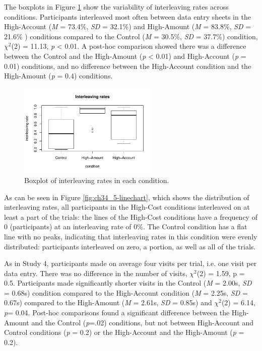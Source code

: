 The boxplots in Figure \ref{fig:ch34_5-boxplots} show the variability of interleaving rates across conditions. Participants interleaved most often between data entry sheets in the High-Account (\textit{M} = 73.4\%, \textit{SD} = 32.1\%) and High-Amount (\textit{M} = 83.8\%, \textit{SD} = 21.6\% ) conditions compared to the Control (\textit{M} = 30.5\%, \textit{SD} = 37.7\%) condition, $\chi^2$(2) = 11.13, \textit{p} < 0.01. A post-hoc comparison showed there was a difference between the Control and the High-Amount (\textit{p} < 0.01) and High-Account (\textit{p} = 0.01) conditions, and no difference between the High-Account condition and the High-Amount (\textit{p} = 0.4) conditions.

\begin{figure}
 \includegraphics[width=0.6\textwidth]{images/ch34/ch4_5-boxplot.pdf}
\caption{Boxplot of interleaving rates in each condition.}
\label{fig:ch34_5-boxplots}
\end{figure}


As can be seen in Figure \ref{fig:ch34_5-linechart}, which shows the distribution of interleaving rates, all participants in the High-Cost conditions interleaved on at least a part of the trials: the lines of the High-Cost conditions have a frequency of 0 (participants) at an interleaving rate of 0\%. The Control condition has a flat line with no peaks, indicating that interleaving rates in this condition were evenly distributed: participants interleaved on zero, a portion, as well as all of the trials.

As in Study 4, participants made on average four visits per trial, i.e. one visit per data entry. There was no difference in the number of visits, $\chi^2$(2) = 1.59, p = 0.5. Participants made significantly shorter visits in the Control (\textit{M} = 2.00s, \textit{SD} = 0.68s) condition compared to the High-Account condition (\textit{M} = 2.25s, \textit{SD} = 0.67s) compared to the High-Amount (\textit{M} = 2.61s, \textit{SD} = 0.85s) and  $\chi^2$(2) = 6.14, \textit{p}= 0.04. Post-hoc comparisons found a significant difference between  the High-Amount and the Control (\textit{p}=.02) conditions, but not between High-Account and Control conditions (\textit{p} = 0.2) or the High-Account and the High-Amount (\textit{p} = 0.2).

